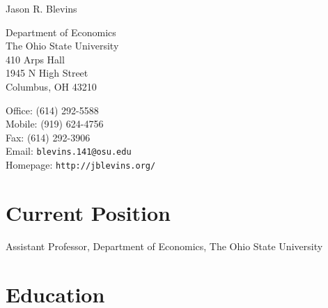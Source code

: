 \documentclass[10pt,letterpaper]{article}
\def\name{Jason R. Blevins}
\begin{document}
{\huge \name}


\vspace{0.25in}

\begin{minipage}[t]{0.5\textwidth}
  Department of Economics \\
  The Ohio State University \\
  410 Arps Hall \\
  1945 N High Street \\
  Columbus, OH 43210
\end{minipage}
\begin{minipage}[t]{0.5\textwidth}
  Office: (614) 292-5588 \\
  Mobile: (919) 624-4756 \\
  Fax: (614) 292-3906 \\
  Email: \texttt{blevins.141@osu.edu} \\
  Homepage: \texttt{http://jblevins.org/} \\
\end{minipage}

\section*{Current Position}

Assistant Professor, Department of Economics, The Ohio State University

\section*{Education}
\end{document}
